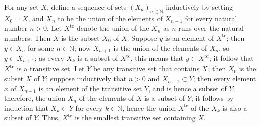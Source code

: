 \documentclass{article}
\begin{document}
\begin{solution}[\ref{exe:v7uvzogi}]
  \label{sol:qx891m3c}
  For any set \(X\), define a sequence of sets
  \((X_n)_{n \in \mathbb{N}}\) inductively by setting \(X_0 = X\), and
  \(X_n\) to be the union of the elements of \(X_{n - 1}\) for every
  natural number \(n > 0\).  Let \(X^{\mathrm{tc}}\) denote the union
  of the \(X_n\) as \(n\) runs over the natural numbers.  Then \(X\)
  is the subset \(X_0\) of \(X\).  Suppose \(y\) is an element of
  \(X^{\mathrm{tc}}\); then \(y \in X_n\) for some
  \(n \in \mathbb{N}\); now \(X_{n + 1}\) is the union of the elements
  of \(X_n\), so \(y \subset X_{n + 1}\); as every \(X_k\) is a subset
  of \(X^{\mathrm{tc}}\), this means that
  \(y \subset X^{\mathrm{tc}}\); it follow that \(X^{\mathrm{tc}}\) is
  a transitive set.  Let \(Y\) be any transitive set that contains
  \(X\); then \(X_0\) is the subset \(X\) of \(Y\); suppose
  inductively that \(n > 0\) and \(X_{n - 1} \subset Y\); then every
  element \(x\) of \(X_{n - 1}\) is an element of the transitive set
  \(Y\), and is hence a subset of \(Y\); therefore, the union \(X_n\)
  of the elements of \(X\) is a subset of \(Y\); it follows by
  induction that \(X_k \subset Y\) for every \(k \in \mathbb{N}\),
  hence the union \(X^{\mathrm{tc}}\) of the \(X_k\) is also a subset
  of \(Y\).  Thus, \(X^{\mathrm{tc}}\) is the smallest transitive set
  containing \(X\).
\end{solution}

\bibsection
\end{document}
